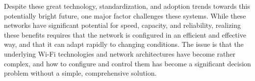 %


Despite these great technology, standardization, and adoption trends towards this potentially bright future, one major factor challenges these systems. While these networks have significant potential for speed, capacity, and reliability, realizing these benefits requires that the network is configured in an efficient and effective way, and that it can adapt rapidly to changing conditions. The issue is that the underlying Wi-Fi technologies and network architectures have become rather complex, and how to configure and control them has become a significant decision problem without a simple, comprehensive solution.

